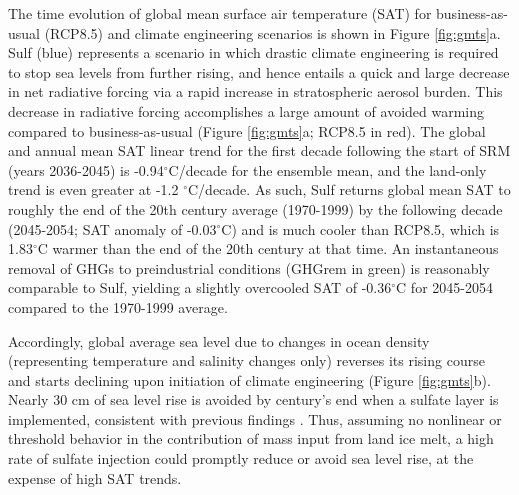 \documentclass{nature}
\begin{document}
The time evolution of global mean surface air temperature (SAT) for business-as-usual (RCP8.5) and climate engineering scenarios is shown in Figure \ref{fig:gmts}a. Sulf (blue) represents a scenario in which drastic climate engineering is required to stop sea levels from further rising, and hence entails a quick and large decrease in net radiative forcing via a rapid increase in stratospheric aerosol burden. This decrease in radiative forcing accomplishes a large amount of avoided warming compared to business-as-usual (Figure \ref{fig:gmts}a; RCP8.5 in red). The global and annual mean SAT linear trend for the first decade following the start of SRM (years 2036-2045) is -0.94$^\circ$C/decade for the ensemble mean, and the land-only trend is even greater at -1.2 $^\circ$C/decade. As such, Sulf returns global mean SAT to roughly the end of the 20th century average (1970-1999) by the following decade (2045-2054; SAT anomaly of -0.03$^\circ$C) and is much cooler than RCP8.5, which is 1.83$^\circ$C warmer than the end of the 20th century at that time. An instantaneous removal of GHGs to preindustrial conditions (GHGrem in green) is reasonably comparable to Sulf, yielding a slightly overcooled SAT of -0.36$^\circ$C for 2045-2054 compared to the 1970-1999 average. %

Accordingly, global average sea level due to changes in ocean density (representing temperature and salinity changes only) reverses its rising course and starts declining upon initiation of climate engineering (Figure \ref{fig:gmts}b). Nearly 30 cm of sea level rise is avoided by century's end when a sulfate layer is implemented, consistent with previous findings \cite{irvine12}. Thus, assuming no nonlinear or threshold behavior in the contribution of mass input from land ice melt, a high rate of sulfate injection could promptly reduce or avoid sea level rise, at the expense of high SAT trends. %
\end{document}
